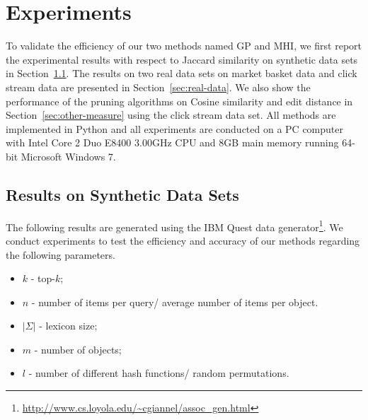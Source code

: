
%
%

\chapter{Experiments}
\label{ch:exp}

To validate the efficiency of our two methods named GP and MHI, we first report the experimental results with respect to Jaccard similarity on synthetic data sets in Section~\ref{sec:syn-data}. The results on two real data sets on market basket data and click stream data are presented in Section~\ref{sec:real-data}. We also show the performance of the pruning algorithms on Cosine similarity and edit distance in Section~\ref{sec:other-measure} using the click stream data set. All methods are implemented in Python and all experiments are conducted on a PC computer with Intel Core 2 Duo E8400 3.00GHz CPU and 8GB main memory running 64-bit Microsoft Windows 7.


\section{Results on Synthetic Data Sets}
\label{sec:syn-data}
The following results are generated using the IBM Quest data generator\footnote{\url{http://www.cs.loyola.edu/~cgiannel/assoc_gen.html}}. We conduct experiments to test the efficiency and accuracy of our methods regarding the following parameters. 

\begin{itemize}
\item $k$ - top-$k$; 
\item $n$ - number of items per query/ average number of items per object.
\item $|\Sigma|$ - lexicon size;
\item $m$ - number of objects;
\item $l$ - number of different hash functions/ random permutations.
\end{itemize}

